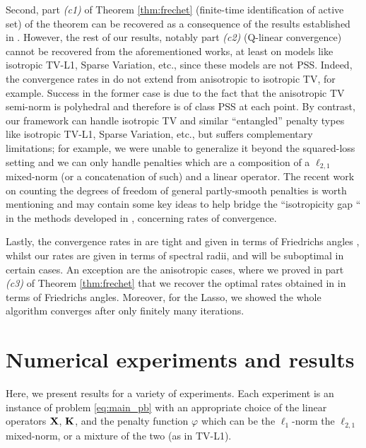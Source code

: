 Second, part \textit{(c1)} of Theorem \ref{thm:frechet} (finite-time
identification of active set) of the theorem can be recovered as a
consequence of the results established in
\citep{liang2014activity,liang2015activity}. However, the rest of our
results, notably part \textit{(c2)} (Q-linear convergence) cannot be
recovered from the aforementioned works, at least on models like
isotropic TV-L1, Sparse Variation, etc., since these models are not
PSS. Indeed, the convergence rates in
\citep{liang2014activity,liang2015activity} do not extend from
anisotropic to isotropic TV, for example. Success in the former case
is due to the fact that the anisotropic TV semi-norm is polyhedral
and therefore is of class PSS at each point. By contrast, our framework
can handle isotropic TV and similar ``entangled'' penalty types like
isotropic TV-L1, Sparse Variation, etc., but suffers complementary
limitations; for example, 
we were unable to generalize it
beyond the squared-loss setting and we can only handle penalties which
are a composition of a $\ell_{2,1}$ mixed-norm (or a concatenation of
such)  and a linear operator. The recent work \citep{vaiter2014degrees} on counting the degrees of freedom of general partly-smooth penalties is worth mentioning and may contain some key ideas to help bridge the ``isotropicity gap `` in the methods developed in \citep{liang2014activity,liang2015activity}, concerning rates of convergence.

Lastly, the convergence rates in
\citep{liang2014activity,liang2015activity}
are tight and given in terms of Friedrichs angles
\citep{bauschke2014optimal}, whilst our rates
are given in terms of spectral radii, and will be
suboptimal in certain cases. An exception are the anisotropic cases,
where we proved in part \textit{(c3)} of Theorem \ref{thm:frechet} that
we recover the optimal rates obtained in
\citep{liang2014activity,liang2015activity} in terms of Friedrichs
angles. Moreover, for the Lasso, we showed the whole algorithm
converges after only finitely many iterations.

\section{Numerical experiments and results}
\label{sec:exp}
Here, we present results for a variety of experiments. Each experiment
is an instance of problem \eqref{eq:main_pb} with an
appropriate choice of the linear operators $\mathbf{X}$, $\mathbf{K}$,  and the penalty
function $\varphi$ which can be the $\ell_1$-norm the
$\ell_{2,1}$ mixed-norm, or a mixture of the two (as in TV-L1).
